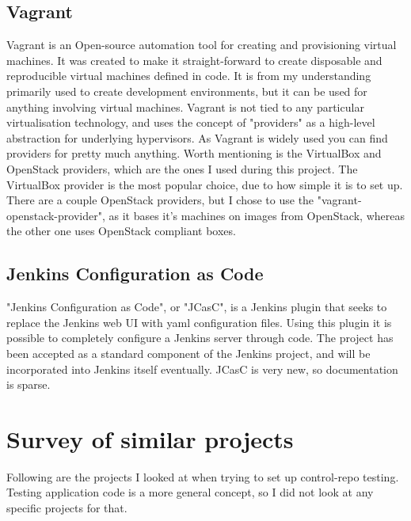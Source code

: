 \subsection{Vagrant}

Vagrant\cite{vagrantwebsite} is an Open-source automation tool for creating and provisioning virtual machines. It was created to make it straight-forward to create disposable and reproducible virtual machines defined in code. It is from my understanding primarily used to create development environments, but it can be used for anything involving virtual machines. Vagrant is not tied to any particular virtualisation technology, and uses the concept of "providers" as a high-level abstraction for underlying hypervisors. As Vagrant is widely used you can find providers for pretty much anything. Worth mentioning is the VirtualBox and OpenStack providers, which are the ones I used during this project. The VirtualBox provider is the most popular choice, due to how simple it is to set up. There are a couple OpenStack providers, but I chose to use the "vagrant-openstack-provider"\cite{vagrantopenstackprovidergithub}, as it bases it's machines on images from OpenStack, whereas the other one uses OpenStack compliant boxes.

\subsection{Jenkins Configuration as Code}

"Jenkins Configuration as Code"\cite{jcascwebsite}, or "JCasC", is a Jenkins plugin that seeks to replace the Jenkins web UI with yaml configuration files. Using this plugin it is possible to completely configure a Jenkins server through code. The project has been accepted as a standard component of the Jenkins project, and will be incorporated into Jenkins itself eventually. JCasC is very new, so documentation is sparse.


\section{Survey of similar projects}

Following are the projects I looked at when trying to set up control-repo testing. Testing application code is a more general concept, so I did not look at any specific projects for that.

